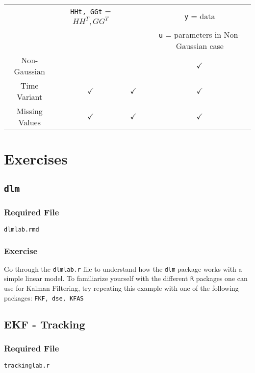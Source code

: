 \documentclass{article}
\newcommand{\code}[1]{\texttt{#1}}
\begin{document}
\begin{landscape}
\begin{tabular}{c | c | c | c | c}
& \code{HHt, GGt} = $HH^T, GG^T$& & &\code{y} = data\\
& & & &\code{u} = parameters in Non-Gaussian case\\
\hline
\hline

Non-Gaussian &  &  &  & $\checkmark$ \\ 
\hline
Time Variant & $\checkmark$& $\checkmark$&  & $\checkmark$\\ 
\hline
Missing Values & $\checkmark$ & $\checkmark$&   & $\checkmark$ \\ 
\hline
\hline
\end{tabular}

\vspace{30pt}
\end{landscape}

\section{Exercises}

\subsection{\tt dlm}
\subsubsection*{Required File}
\code{dlmlab.rmd} 
\subsubsection*{Exercise}
Go through the \code{dlmlab.r} file to understand how the \code{dlm} package works with a simple linear model. To familiarize yourself with the different \code{R} packages one can use for Kalman Filtering, try repeating this example with one of the following packages: \code{FKF, dse, KFAS} 

\subsection{EKF - Tracking}
\subsubsection*{Required File}
 \code{trackinglab.r}
\end{document}
